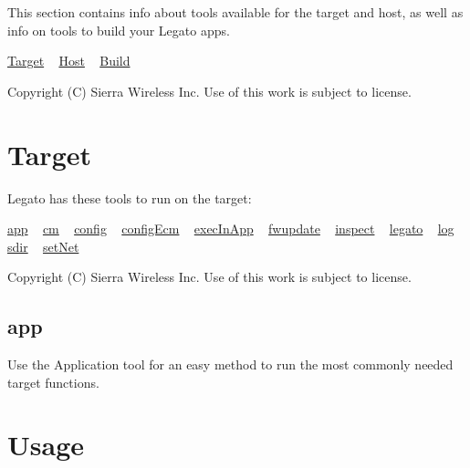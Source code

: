 This section contains info about tools available for the target and host, as well as info on tools to build your Legato apps.





\hyperlink{toolsTarget}{Target} ~\newline
 \hyperlink{toolsHost}{Host} ~\newline
 \hyperlink{buildTools}{Build} ~\newline






Copyright (C) Sierra Wireless Inc. Use of this work is subject to license. \hypertarget{toolsTarget}{}\section{Target}\label{toolsTarget}
Legato has these tools to run on the target\+:

\hyperlink{toolsTarget_app}{app} ~\newline
 \hyperlink{toolsTarget_cm}{cm} ~\newline
 \hyperlink{toolsTarget_config}{config} ~\newline
 \hyperlink{toolsTarget_configEcm}{config\+Ecm} ~\newline
 \hyperlink{toolsTarget_execInApp}{exec\+In\+App} ~\newline
 \hyperlink{toolsTarget_fwUpdate}{fwupdate} ~\newline
 \hyperlink{toolsTarget_inspect}{inspect} ~\newline
 \hyperlink{toolsTarget_legato}{legato} ~\newline
 \hyperlink{toolsTarget_log}{log} ~\newline
 \hyperlink{toolsTarget_sdir}{sdir} ~\newline
 \hyperlink{toolsTarget_setNet}{set\+Net} ~\newline






Copyright (C) Sierra Wireless Inc. Use of this work is subject to license. \hypertarget{toolsTarget_app}{}\subsection{app}\label{toolsTarget_app}
Use the Application tool for an easy method to run the most commonly needed target functions.

\section*{Usage}


